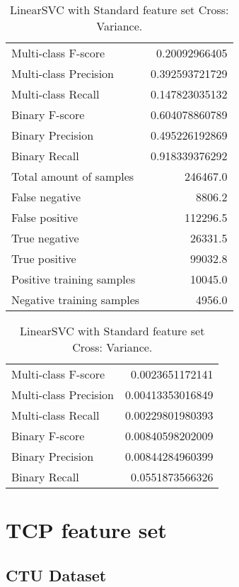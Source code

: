 \begin{table}[H]
\begin{minipage}{0.5\textwidth}
\caption{LinearSVC with Standard feature set Cross: Average.}
\centering
\begin{tabular}{l r}
\toprule
Multi-class F-score & 0.20092966405 \\
Multi-class Precision & 0.392593721729 \\
Multi-class Recall & 0.147823035132 \\
\midrule
Binary F-score & 0.604078860789 \\
Binary Precision & 0.495226192869 \\
Binary Recall & 0.918339376292 \\
\midrule
Total amount of samples & 246467.0 \\
False negative & 8806.2 \\
False positive & 112296.5 \\
True negative & 26331.5 \\
True positive & 99032.8 \\
\midrule
Positive training samples & 10045.0 \\
Negative training samples & 4956.0 \\
\bottomrule
\end{tabular}
\end{minipage}
\hfillx
\begin{minipage}{0.5\textwidth}
\caption{LinearSVC with Standard feature set Cross: Variance.}
\centering
\begin{tabular}{l r}
\toprule
Multi-class F-score & 0.0023651172141 \\
Multi-class Precision & 0.00413353016849 \\
Multi-class Recall & 0.00229801980393 \\
\midrule
Binary F-score & 0.00840598202009 \\
Binary Precision & 0.00844284960399 \\
Binary Recall & 0.0551873566326 \\
\bottomrule
\end{tabular}
\end{minipage}
\end{table}

\newpage
\section{TCP feature set}
\subsection{CTU Dataset}


